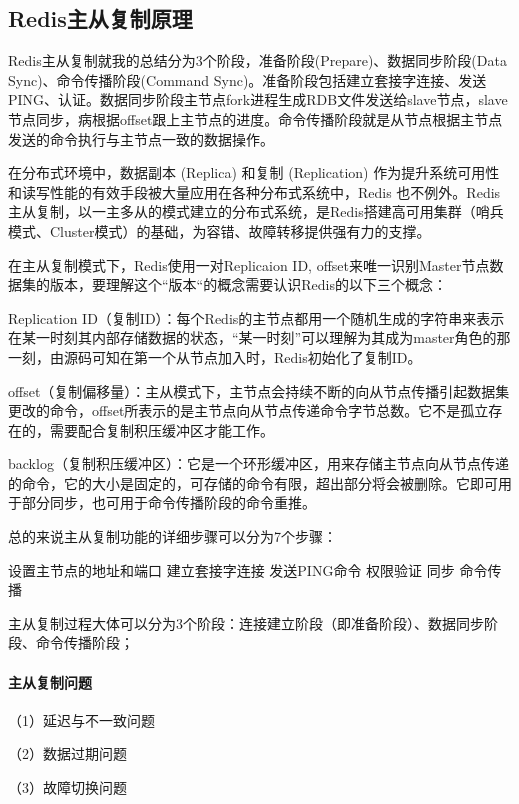 \documentclass[../../../interview-questions.tex]{subfiles}
\begin{document}
\subsection{Redis主从复制原理}

Redis主从复制就我的总结分为3个阶段，准备阶段(Prepare)、数据同步阶段(Data Sync)、命令传播阶段(Command Sync)。准备阶段包括建立套接字连接、发送PING、认证。数据同步阶段主节点fork进程生成RDB文件发送给slave节点，slave节点同步，病根据offset跟上主节点的进度。命令传播阶段就是从节点根据主节点发送的命令执行与主节点一致的数据操作。

在分布式环境中，数据副本 (Replica) 和复制 (Replication) 作为提升系统可用性和读写性能的有效手段被大量应用在各种分布式系统中，Redis 也不例外。Redis主从复制，以一主多从的模式建立的分布式系统，是Redis搭建高可用集群（哨兵模式、Cluster模式）的基础，为容错、故障转移提供强有力的支撑。

在主从复制模式下，Redis使用一对Replicaion ID, offset来唯一识别Master节点数据集的版本，要理解这个“版本“的概念需要认识Redis的以下三个概念：

Replication ID（复制ID）：每个Redis的主节点都用一个随机生成的字符串来表示在某一时刻其内部存储数据的状态，“某一时刻”可以理解为其成为master角色的那一刻，由源码可知在第一个从节点加入时，Redis初始化了复制ID。

offset（复制偏移量）：主从模式下，主节点会持续不断的向从节点传播引起数据集更改的命令，offset所表示的是主节点向从节点传递命令字节总数。它不是孤立存在的，需要配合复制积压缓冲区才能工作。

backlog（复制积压缓冲区）：它是一个环形缓冲区，用来存储主节点向从节点传递的命令，它的大小是固定的，可存储的命令有限，超出部分将会被删除。它即可用于部分同步，也可用于命令传播阶段的命令重推。



总的来说主从复制功能的详细步骤可以分为7个步骤：

设置主节点的地址和端口
建立套接字连接
发送PING命令
权限验证
同步
命令传播

主从复制过程大体可以分为3个阶段：连接建立阶段（即准备阶段）、数据同步阶段、命令传播阶段；

\paragraph{主从复制问题}

（1）延迟与不一致问题

（2）数据过期问题

（3）故障切换问题
\end{document}
